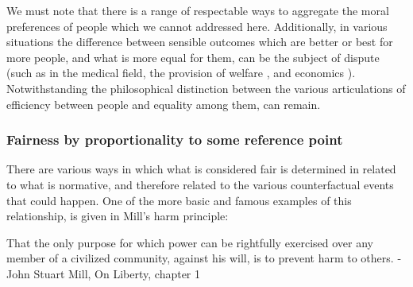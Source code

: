 We must note that there is a range of respectable ways to aggregate the moral preferences of people which we cannot addressed here.
Additionally, in various situations the difference between sensible outcomes which are better or best for more people, and what is more equal for them, can be the subject of dispute (such as in the medical field\cite{Reidpath2012,RePEc:chy:respap:120cherp}, the provision of welfare \cite{10.2307/27522452}, and economics \cite{10.1093/oep/gpz040}). Notwithstanding the philosophical distinction between the various articulations of efficiency between people and equality among them, can remain.



\subsubsection{Fairness by proportionality to some reference point}\label{sec:reference_points}

There are various ways in which what is considered fair is determined in related to what is normative, and therefore related to the various counterfactual events that could happen.
One of the more basic and famous examples of this relationship, is given in Mill's harm principle:

\begin{displayquote}
That the only purpose for which power can be rightfully exercised over any member of a civilized community, against his will, is to prevent harm to others. - John Stuart Mill, On Liberty, chapter 1 \cite{Mill2Gutenberg}
\end{displayquote}

